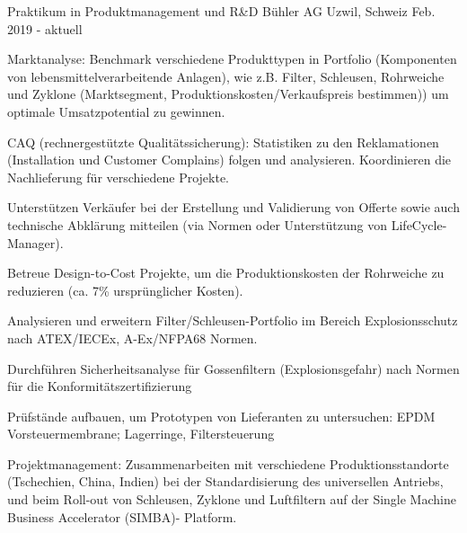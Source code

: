 

\begin{cventries}

\cventry
	{Praktikum in Produktmanagement und R\&D} %
	{Bühler AG} %
	{Uzwil, Schweiz} %
	{Feb. 2019 - aktuell} %
	{
		\begin{cvitems} %
			\item {Marktanalyse: Benchmark verschiedene Produkttypen in Portfolio (Komponenten von lebensmittelverarbeitende Anlagen), wie z.B. Filter, Schleusen, Rohrweiche und Zyklone (Marktsegment, Produktionskosten/Verkaufspreis bestimmen)) um optimale Umsatzpotential zu gewinnen.}
			\item {CAQ (rechnergestützte Qualitätssicherung): Statistiken zu den Reklamationen (Installation und Customer Complains) folgen und analysieren. Koordinieren die Nachlieferung für verschiedene Projekte.}
			\item {Unterstützen Verkäufer bei der Erstellung und Validierung von Offerte sowie auch technische Abklärung mitteilen (via Normen oder Unterstützung von LifeCycle-Manager).}
			\item {Betreue Design-to-Cost Projekte, um die Produktionskosten der Rohrweiche zu reduzieren (ca. 7\% ursprünglicher Kosten).}
			\item {Analysieren und erweitern Filter/Schleusen-Portfolio im Bereich Explosionsschutz nach ATEX/IECEx, A-Ex/NFPA68 Normen.}
			\item {Durchführen Sicherheitsanalyse für Gossenfiltern (Explosionsgefahr) nach Normen für die Konformitätszertifizierung}
			\item {Prüfstände aufbauen, um Prototypen von Lieferanten zu untersuchen: EPDM Vorsteuermembrane; Lagerringe, Filtersteuerung}
			\item {Projektmanagement: Zusammenarbeiten mit verschiedene Produktionsstandorte (Tschechien, China, Indien) bei der Standardisierung des universellen Antriebs, und beim Roll-out von Schleusen, Zyklone und Luftfiltern auf der Single Machine Business Accelerator (SIMBA)- Platform.}
		\end{cvitems}
}	



\end{cventries}
